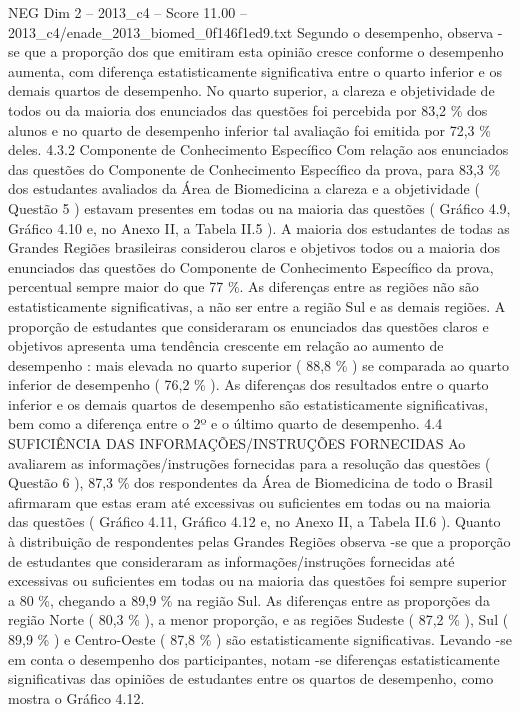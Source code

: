 \begin{textsample}{NEG Dim 2 – 2013\_c4 – Score 11.00 – 2013\_c4/enade\_2013\_biomed\_0f146f1ed9.txt}
Segundo o desempenho, observa -se que a proporção dos que emitiram esta opinião cresce conforme o desempenho aumenta, com diferença estatisticamente significativa entre o quarto inferior e os demais quartos de desempenho.
No quarto superior, a clareza e objetividade de todos ou da maioria dos enunciados das questões foi percebida por 83,2 \% dos alunos e no quarto de desempenho inferior tal avaliação foi emitida por 72,3 \% deles. 4.3.2 Componente de Conhecimento Específico Com relação aos enunciados das questões do Componente de Conhecimento Específico da prova, para 83,3 \% dos estudantes avaliados da Área de Biomedicina a clareza e a objetividade ( Questão 5 ) estavam presentes em todas ou na maioria das questões ( Gráfico 4.9, Gráfico 4.10 e, no Anexo II, a Tabela II.5 ).
A maioria dos estudantes de todas as Grandes Regiões brasileiras considerou claros e objetivos todos ou a maioria dos enunciados das questões do Componente de Conhecimento Específico da prova, percentual sempre maior do que 77 \%.
As diferenças entre as regiões não são estatisticamente significativas, a não ser entre a região Sul e as demais regiões.
A proporção de estudantes que consideraram os enunciados das questões claros e objetivos apresenta uma tendência crescente em relação ao aumento de desempenho : mais elevada no quarto superior ( 88,8 \% ) se comparada ao quarto inferior de desempenho ( 76,2 \% ).
As diferenças dos resultados entre o quarto inferior e os demais quartos de desempenho são estatisticamente significativas, bem como a diferença entre o 2º e o último quarto de desempenho. 4.4 SUFICIÊNCIA DAS INFORMAÇÕES/INSTRUÇÕES FORNECIDAS Ao avaliarem as informações/instruções fornecidas para a resolução das questões ( Questão 6 ), 87,3 \% dos respondentes da Área de Biomedicina de todo o Brasil afirmaram que estas eram até excessivas ou suficientes em todas ou na maioria das questões ( Gráfico 4.11, Gráfico 4.12 e, no Anexo II, a Tabela II.6 ).
Quanto à distribuição de respondentes pelas Grandes Regiões observa -se que a proporção de estudantes que consideraram as informações/instruções fornecidas até excessivas ou suficientes em todas ou na maioria das questões foi sempre superior a 80 \%, chegando a 89,9 \% na região Sul.
As diferenças entre as proporções da região Norte ( 80,3 \% ), a menor proporção, e as regiões Sudeste ( 87,2 \% ), Sul ( 89,9 \% ) e Centro-Oeste ( 87,8 \% ) são estatisticamente significativas.
Levando -se em conta o desempenho dos participantes, notam -se diferenças estatisticamente significativas das opiniões de estudantes entre os quartos de desempenho, como mostra o Gráfico 4.12.

\end{textsample}
